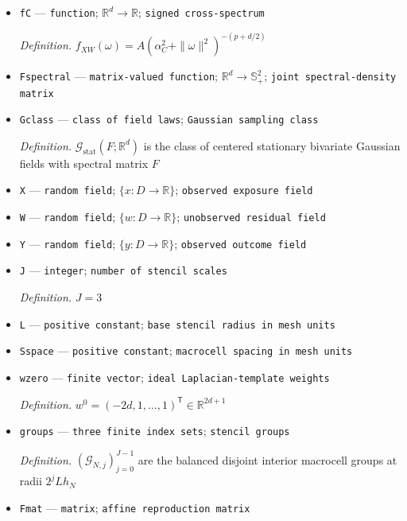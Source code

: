 \documentclass{article}
\begin{document}
\begin{itemize}
  \par\smallskip\noindent\emph{Definition.} \(f_W(\omega)=c_W(\alpha_W^2+\|\omega\|^2)^{-(d+1)/2}\)
  \item \texttt{fC} --- \texttt{function}; \(\mathbb R^d\to\mathbb R\); \texttt{signed cross-\allowbreak{}spectrum}
  \par\smallskip\noindent\emph{Definition.} \(f_{XW}(\omega)=A(\alpha_C^2+\|\omega\|^2)^{-(p+d/2)}\)
  \item \texttt{Fspectral} --- \texttt{matrix-\allowbreak{}valued function}; \(\mathbb R^d\to\mathbb S_+^2\); \texttt{joint spectral-\allowbreak{}density matrix}
  \item \texttt{Gclass} --- \texttt{class of field laws}; \texttt{Gaussian sampling class}
  \par\smallskip\noindent\emph{Definition.} \(\mathcal G_{\mathrm{stat}}(F;\mathbb R^d)\) is the class of centered stationary bivariate Gaussian fields with spectral matrix \(F\)
  \item \texttt{X} --- \texttt{random field}; \(\{x:D\to\mathbb R\}\); \texttt{observed exposure field}
  \item \texttt{W} --- \texttt{random field}; \(\{w:D\to\mathbb R\}\); \texttt{unobserved residual field}
  \item \texttt{Y} --- \texttt{random field}; \(\{y:D\to\mathbb R\}\); \texttt{observed outcome field}
  \item \texttt{J} --- \texttt{integer}; \texttt{number of stencil scales}
  \par\smallskip\noindent\emph{Definition.} \(J=3\)
  \item \texttt{L} --- \texttt{positive constant}; \texttt{base stencil radius in mesh units}
  \item \texttt{Sspace} --- \texttt{positive constant}; \texttt{macrocell spacing in mesh units}
  \item \texttt{wzero} --- \texttt{finite vector}; \texttt{ideal Laplacian-\allowbreak{}template weights}
  \par\smallskip\noindent\emph{Definition.} \(w^0=(-2d,1,\ldots,1)^{\mathsf T}\in\mathbb R^{2d+1}\)
  \item \texttt{groups} --- \texttt{three finite index sets}; \texttt{stencil groups}
  \par\smallskip\noindent\emph{Definition.} \((\mathcal G_{N,j})_{j=0}^{J-1}\) are the balanced disjoint interior macrocell groups at radii \(2^jLh_N\)
  \item \texttt{Fmat} --- \texttt{matrix}; \texttt{affine reproduction matrix}

\end{itemize}
\end{document}
